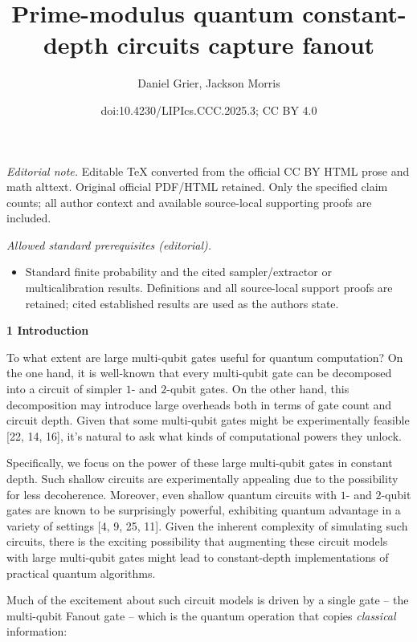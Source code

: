 \documentclass[10pt,a4paper]{article}
\title{Prime-modulus quantum constant-depth circuits capture fanout}
\author{Daniel Grier, Jackson Morris}
\date{doi:10.4230/LIPIcs.CCC.2025.3; CC BY 4.0}
\begin{document}
\maketitle
\noindent\textit{Editorial note.} Editable TeX converted from the official CC BY HTML prose and math alttext. Original official PDF/HTML retained. Only the specified claim counts; all author context and available source-local supporting proofs are included.\par\medskip
\noindent\textit{Allowed standard prerequisites (editorial).}\begin{itemize}
\item Standard finite probability and the cited sampler/extractor or multicalibration results. Definitions and all source-local support proofs are retained; cited established results are used as the authors state.
\end{itemize}\medskip


\par\medskip\noindent\textbf{
1 Introduction}\par




To what extent are large multi-qubit gates useful for quantum computation? On the one hand, it is well-known that every multi-qubit gate can be decomposed into a circuit of simpler $1$- and $2$-qubit gates. On the other hand, this decomposition may introduce large overheads both in terms of gate count and circuit depth. Given that some multi-qubit gates might be experimentally feasible [22, 14, 16], it’s natural to ask what kinds of computational powers they unlock.\par




Specifically, we focus on the power of these large multi-qubit gates in constant depth. Such shallow circuits are experimentally appealing due to the possibility for less decoherence. Moreover, even shallow quantum circuits with $1$- and $2$-qubit gates are known to be surprisingly powerful, exhibiting quantum advantage in a variety of settings [4, 9, 25, 11]. Given the inherent complexity of simulating such circuits, there is the exciting possibility that augmenting these circuit models with large multi-qubit gates might lead to constant-depth implementations of practical quantum algorithms.\par




Much of the excitement about such circuit models is driven by a single gate – the multi-qubit Fanout gate – which is the quantum operation that copies \emph{classical} information:\par
\end{document}
